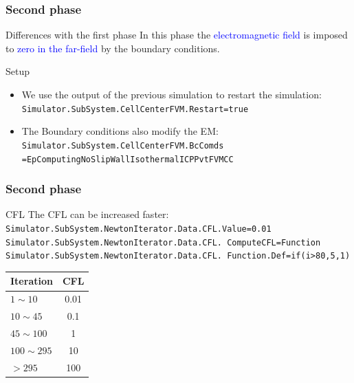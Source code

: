 \documentclass[compress,10pt]{beamer}
\begin{document}
\begin{frame}
\frametitle{Second phase}
\begin{block}{Differences with the first phase}
 In this phase the \textcolor{blue}{electromagnetic field} is imposed to \textcolor{blue}{zero in the far-field}
by the boundary conditions.
\end{block}

\begin{block}{Setup}
\begin{itemize}
\item We use the output of the previous simulation to restart the simulation:\\
\texttt{\small{Simulator.SubSystem.CellCenterFVM.Restart=true}}
\item The Boundary conditions also modify the EM:\\
\texttt{\small{Simulator.SubSystem.CellCenterFVM.BcComds
\hspace*{2cm}=EpComputingNoSlipWallIsothermalICPPvtFVMCC}}
\end{itemize}
\end{block}
\end{frame}

\begin{frame}
 \frametitle{Second phase}
 \begin{block}{CFL}
 The CFL can be increased faster:
 \texttt{\small{Simulator.SubSystem.NewtonIterator.Data.CFL.Value=0.01}}\\
 \texttt{\small{Simulator.SubSystem.NewtonIterator.Data.CFL.
 \hspace*{2cm}ComputeCFL=Function}}\\
 \texttt{\small{Simulator.SubSystem.NewtonIterator.Data.CFL.
 \hspace*{2cm}Function.Def=if(i>80,5,1)}}\\
\begin{center} 
\begin{tabular}{lc}
 \textbf{Iteration} & \textbf{CFL} \\ \hline
 $1 \sim 10 $ & 0.01 \\ \hline
 $10 \sim 45 $ & 0.1 \\ \hline
 $45 \sim 100 $ & 1 \\ \hline
 $100 \sim 295 $ & 10 \\ \hline
 $>295$ & 100 \\ 
 \hline
 \end{tabular}
\end{center}
 \end{block}
\end{frame}
\end{document}
